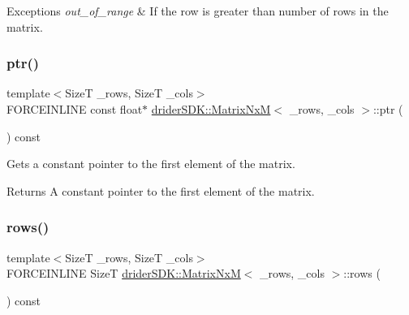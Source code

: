 \begin{DoxyExceptions}{Exceptions}
{\em out\+\_\+of\+\_\+range} & If the row is greater than number of rows in the matrix. \\
\hline
\end{DoxyExceptions}
\mbox{\label{classdrider_s_d_k_1_1_matrix_nx_m_a83a52f8f520f04a41d0f47e09b1bdbe4}} 
\subsubsection{\texorpdfstring{ptr()}{ptr()}}
{\footnotesize\ttfamily template$<$SizeT \+\_\+rows, SizeT \+\_\+cols$>$ \\
F\+O\+R\+C\+E\+I\+N\+L\+I\+NE const float$\ast$ \hyperlink{classdrider_s_d_k_1_1_matrix_nx_m}{drider\+S\+D\+K\+::\+Matrix\+NxM}$<$ \+\_\+rows, \+\_\+cols $>$\+::ptr (\begin{DoxyParamCaption}{ }\end{DoxyParamCaption}) const\hspace{0.3cm}{\ttfamily [inline]}}

Gets a constant pointer to the first element of the matrix.

\begin{DoxyReturn}{Returns}
A constant pointer to the first element of the matrix. 
\end{DoxyReturn}
\mbox{\label{classdrider_s_d_k_1_1_matrix_nx_m_ae3f23c2fca691ab624f40759aced9fee}} 
\subsubsection{\texorpdfstring{rows()}{rows()}}
{\footnotesize\ttfamily template$<$SizeT \+\_\+rows, SizeT \+\_\+cols$>$ \\
F\+O\+R\+C\+E\+I\+N\+L\+I\+NE SizeT \hyperlink{classdrider_s_d_k_1_1_matrix_nx_m}{drider\+S\+D\+K\+::\+Matrix\+NxM}$<$ \+\_\+rows, \+\_\+cols $>$\+::rows (\begin{DoxyParamCaption}{ }\end{DoxyParamCaption}) const\hspace{0.3cm}{\ttfamily [inline]}}

